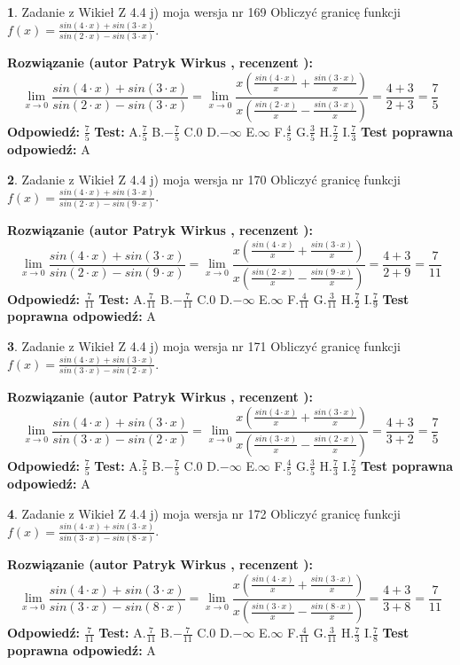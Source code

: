 \documentclass[12pt, a4paper]{article}
\theoremstyle{definition} %
\newtheorem{zad}{}
\newcommand{\zadStart}[1]{\begin{zad}#1\newline}
\newcommand{\zadStop}{\end{zad}}
\newcommand{\rozwStart}[2]{\noindent \textbf{Rozwiązanie (autor #1 , recenzent #2): }\newline}
\newcommand{\rozwStop}{\newline}
\newcommand{\odpStart}{\noindent \textbf{Odpowiedź:}\newline}
\newcommand{\odpStop}{\newline}
\newcommand{\testStart}{\noindent \textbf{Test:}\newline}
\newcommand{\testStop}{\newline}
\newcommand{\kluczStart}{\noindent \textbf{Test poprawna odpowiedź:}\newline}
\newcommand{\kluczStop}{\newline}
\begin{document}
\zadStart{Zadanie z Wikieł Z 4.4 j) moja wersja nr 169}
Obliczyć granicę funkcji $f(x)=\frac{sin(4\cdot x) +sin(3\cdot x)}{sin(2\cdot x) -sin(3\cdot x)}$.
\zadStop
\rozwStart{Patryk Wirkus}{}
$$\lim\limits_{x\to 0}\frac{sin(4\cdot x) +sin(3\cdot x)}{sin(2\cdot x) -sin(3\cdot x)}=\lim\limits_{x\to 0}\frac{x(\frac{sin(4\cdot x)}{x}+\frac{sin(3\cdot x)}{x})}{x(\frac{sin(2\cdot x)}{x}-\frac{sin(3\cdot x)}{x})}=\frac{4+3}{2+3} = \frac{7}{5}$$
\rozwStop
\odpStart
$\frac{7}{5}$
\odpStop
\testStart
A.$\frac{7}{5}$
B.$-\frac{7}{5}$
C.$0$
D.$-\infty$
E.$\infty$
F.$\frac{4}{5}$
G.$\frac{3}{5}$
H.$\frac{7}{2}$
I.$\frac{7}{3}$
\testStop
\kluczStart
A
\kluczStop



\zadStart{Zadanie z Wikieł Z 4.4 j) moja wersja nr 170}
Obliczyć granicę funkcji $f(x)=\frac{sin(4\cdot x) +sin(3\cdot x)}{sin(2\cdot x) -sin(9\cdot x)}$.
\zadStop
\rozwStart{Patryk Wirkus}{}
$$\lim\limits_{x\to 0}\frac{sin(4\cdot x) +sin(3\cdot x)}{sin(2\cdot x) -sin(9\cdot x)}=\lim\limits_{x\to 0}\frac{x(\frac{sin(4\cdot x)}{x}+\frac{sin(3\cdot x)}{x})}{x(\frac{sin(2\cdot x)}{x}-\frac{sin(9\cdot x)}{x})}=\frac{4+3}{2+9} = \frac{7}{11}$$
\rozwStop
\odpStart
$\frac{7}{11}$
\odpStop
\testStart
A.$\frac{7}{11}$
B.$-\frac{7}{11}$
C.$0$
D.$-\infty$
E.$\infty$
F.$\frac{4}{11}$
G.$\frac{3}{11}$
H.$\frac{7}{2}$
I.$\frac{7}{9}$
\testStop
\kluczStart
A
\kluczStop



\zadStart{Zadanie z Wikieł Z 4.4 j) moja wersja nr 171}
Obliczyć granicę funkcji $f(x)=\frac{sin(4\cdot x) +sin(3\cdot x)}{sin(3\cdot x) -sin(2\cdot x)}$.
\zadStop
\rozwStart{Patryk Wirkus}{}
$$\lim\limits_{x\to 0}\frac{sin(4\cdot x) +sin(3\cdot x)}{sin(3\cdot x) -sin(2\cdot x)}=\lim\limits_{x\to 0}\frac{x(\frac{sin(4\cdot x)}{x}+\frac{sin(3\cdot x)}{x})}{x(\frac{sin(3\cdot x)}{x}-\frac{sin(2\cdot x)}{x})}=\frac{4+3}{3+2} = \frac{7}{5}$$
\rozwStop
\odpStart
$\frac{7}{5}$
\odpStop
\testStart
A.$\frac{7}{5}$
B.$-\frac{7}{5}$
C.$0$
D.$-\infty$
E.$\infty$
F.$\frac{4}{5}$
G.$\frac{3}{5}$
H.$\frac{7}{3}$
I.$\frac{7}{2}$
\testStop
\kluczStart
A
\kluczStop



\zadStart{Zadanie z Wikieł Z 4.4 j) moja wersja nr 172}
Obliczyć granicę funkcji $f(x)=\frac{sin(4\cdot x) +sin(3\cdot x)}{sin(3\cdot x) -sin(8\cdot x)}$.
\zadStop
\rozwStart{Patryk Wirkus}{}
$$\lim\limits_{x\to 0}\frac{sin(4\cdot x) +sin(3\cdot x)}{sin(3\cdot x) -sin(8\cdot x)}=\lim\limits_{x\to 0}\frac{x(\frac{sin(4\cdot x)}{x}+\frac{sin(3\cdot x)}{x})}{x(\frac{sin(3\cdot x)}{x}-\frac{sin(8\cdot x)}{x})}=\frac{4+3}{3+8} = \frac{7}{11}$$
\rozwStop
\odpStart
$\frac{7}{11}$
\odpStop
\testStart
A.$\frac{7}{11}$
B.$-\frac{7}{11}$
C.$0$
D.$-\infty$
E.$\infty$
F.$\frac{4}{11}$
G.$\frac{3}{11}$
H.$\frac{7}{3}$
I.$\frac{7}{8}$
\testStop
\kluczStart
A
\kluczStop
\end{document}
